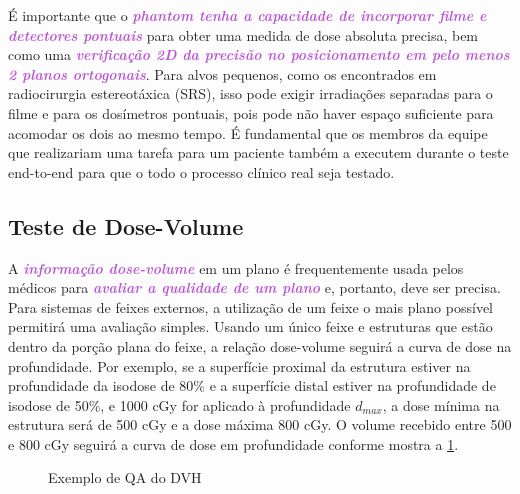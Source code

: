 \documentclass[11pt,a4paper]{article}
\newcounter{exemplo}
\begin{document}
	É importante que o \textcolor{MediumOrchid}{\textbf{\textit{phantom tenha a capacidade de incorporar filme e detectores pontuais}}} para obter uma medida de dose absoluta precisa, bem como uma \textcolor{MediumOrchid}{\textbf{\textit{verificação 2D da precisão no posicionamento em pelo menos 2 planos ortogonais}}}. Para alvos pequenos, como os encontrados em radiocirurgia estereotáxica (SRS), isso pode exigir irradiações separadas para o filme e para os dosímetros pontuais, pois pode não haver espaço suficiente para acomodar os dois ao mesmo tempo. É fundamental que os membros da equipe que realizariam uma tarefa para um paciente também a executem durante o teste end-to-end para que o todo o processo clínico real seja testado.

\subsection*{Teste de Dose-Volume}

	A \textcolor{MediumOrchid}{\textbf{\textit{informação dose-volume}}} em um plano é frequentemente usada pelos médicos para \textcolor{MediumOrchid}{\textbf{\textit{avaliar a qualidade de um plano}}} e, portanto, deve ser precisa. Para sistemas de feixes externos, a utilização de um feixe o mais plano possível permitirá uma avaliação simples. Usando um único feixe e estruturas que estão dentro da porção plana do feixe, a relação dose-volume seguirá a curva de dose na profundidade. Por exemplo, se a superfície proximal da estrutura estiver na profundidade da isodose de 80\% e a superfície distal estiver na profundidade de isodose de 50\%, e 1000 cGy for aplicado à profundidade $d_{max}$, a dose mínima na estrutura será de 500 cGy e a dose máxima 800 cGy. O volume recebido entre 500 e 800 cGy seguirá a curva de dose em profundidade conforme mostra a \ref{fig:exemploQaDvh}.

	\begin{figure}[h]
		\centering
		\caption{Exemplo de QA do DVH}
		\label{fig:exemploQaDvh}
	\end{figure}
\end{document}
